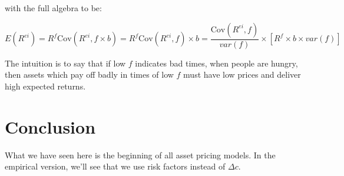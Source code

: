 with the full algebra to be:

\begin{equation}
    E(R^{ei}) = R^f \text{Cov}(R^{ei}, f \times b) = R^f \text{Cov}(R^{ei}, f) \times b 
    = \frac{\text{Cov}(R^{ei}, f)}{var(f)} \times [R^f \times b \times var(f)] 
\end{equation}

The intuition is to say that if low $f$ indicates bad times, 
when people are hungry, then assets which pay off badly in times 
of low $f$ must have low prices and deliver high expected returns.




\section{Conclusion}

What we have seen here is the beginning of all asset pricing 
models. In the empirical version, we'll see that 
we use risk factors instead of $\Delta c$.